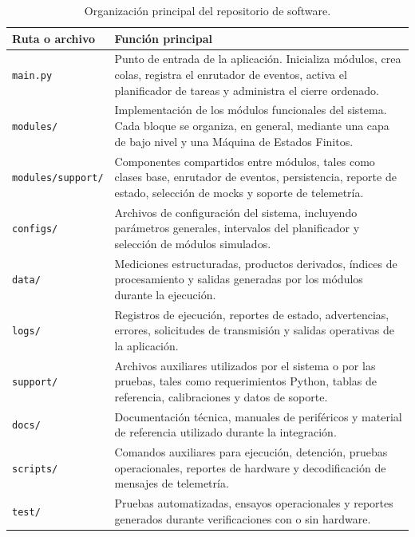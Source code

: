 \begin{table}[htbp]
\centering
\caption{Organización principal del repositorio de software.}
\label{tab:organizacion-repo-software}
\footnotesize
\begingroup
\renewcommand{\arraystretch}{1.15}
\begin{tabularx}{\textwidth}{@{}p{}X@{}}
\toprule
\textbf{Ruta o archivo} & \textbf{Función principal} \tabularnewline
\midrule

\texttt{main.py} &
Punto de entrada de la aplicación. Inicializa módulos, crea colas, registra el enrutador de eventos, activa el planificador de tareas y administra el cierre ordenado. \tabularnewline

\addlinespace[0.35em]

\texttt{modules/} &
Implementación de los módulos funcionales del sistema. Cada bloque se organiza, en general, mediante una capa de bajo nivel y una Máquina de Estados Finitos. \tabularnewline

\addlinespace[0.35em]

\texttt{modules/support/} &
Componentes compartidos entre módulos, tales como clases base, enrutador de eventos, persistencia, reporte de estado, selección de mocks y soporte de telemetría. \tabularnewline

\addlinespace[0.35em]

\texttt{configs/} &
Archivos de configuración del sistema, incluyendo parámetros generales, intervalos del planificador y selección de módulos simulados. \tabularnewline

\addlinespace[0.35em]

\texttt{data/} &
Mediciones estructuradas, productos derivados, índices de procesamiento y salidas generadas por los módulos durante la ejecución. \tabularnewline

\addlinespace[0.35em]

\texttt{logs/} &
Registros de ejecución, reportes de estado, advertencias, errores, solicitudes de transmisión y salidas operativas de la aplicación. \tabularnewline

\addlinespace[0.35em]

\texttt{support/} &
Archivos auxiliares utilizados por el sistema o por las pruebas, tales como requerimientos Python, tablas de referencia, calibraciones y datos de soporte. \tabularnewline

\addlinespace[0.35em]

\texttt{docs/} &
Documentación técnica, manuales de periféricos y material de referencia utilizado durante la integración. \tabularnewline

\addlinespace[0.35em]

\texttt{scripts/} &
Comandos auxiliares para ejecución, detención, pruebas operacionales, reportes de hardware y decodificación de mensajes de telemetría. \tabularnewline

\addlinespace[0.35em]

\texttt{test/} &
Pruebas automatizadas, ensayos operacionales y reportes generados durante verificaciones con o sin hardware. \tabularnewline

\bottomrule
\end{tabularx}
\endgroup
\end{table}

